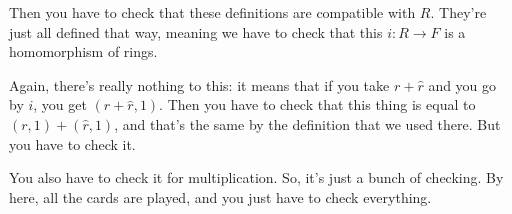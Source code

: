 \begin{speech}[01:05:39 - 01:06:43]
Then you have to check that these definitions are compatible with $R$. They're just all defined that way, meaning we have to check  that this $i \colon R \to F$ is a homomorphism of rings.

Again, there's really nothing to this: it means that if you take $r + \hat{r}$  and you go by $i$, you get $(r + \hat{r}, 1)$. Then you have to check that this thing is equal to $(r, 1) + (\hat{r}, 1)$,  and that's the same by the definition that we used there. But you have to check it.

You also have to check it for multiplication. So, it's just a bunch of checking. By here, all the cards are played, and you just have to check everything.
\end{speech}

